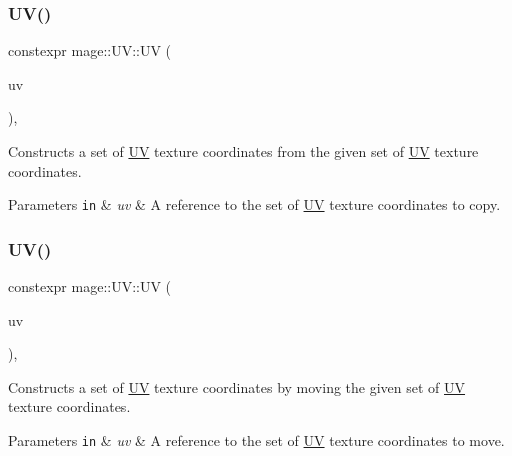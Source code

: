 \subsubsection{\texorpdfstring{U\+V()}{UV()}\hspace{0.1cm}{\footnotesize\ttfamily [3/5]}}
{\footnotesize\ttfamily constexpr mage\+::\+U\+V\+::\+UV (\begin{DoxyParamCaption}\item[{const \hyperlink{structmage_1_1_u_v}{UV} \&}]{uv }\end{DoxyParamCaption})\hspace{0.3cm}{\ttfamily [default]}, {\ttfamily [noexcept]}}

Constructs a set of \hyperlink{structmage_1_1_u_v}{UV} texture coordinates from the given set of \hyperlink{structmage_1_1_u_v}{UV} texture coordinates.


\begin{DoxyParams}[1]{Parameters}
\mbox{\tt in}  & {\em uv} & A reference to the set of \hyperlink{structmage_1_1_u_v}{UV} texture coordinates to copy. \\
\hline
\end{DoxyParams}
\hypertarget{structmage_1_1_u_v_aea441530786bac9c6eb02bff653834bd}{}\label{structmage_1_1_u_v_aea441530786bac9c6eb02bff653834bd} 
\subsubsection{\texorpdfstring{U\+V()}{UV()}\hspace{0.1cm}{\footnotesize\ttfamily [4/5]}}
{\footnotesize\ttfamily constexpr mage\+::\+U\+V\+::\+UV (\begin{DoxyParamCaption}\item[{\hyperlink{structmage_1_1_u_v}{UV} \&\&}]{uv }\end{DoxyParamCaption})\hspace{0.3cm}{\ttfamily [default]}, {\ttfamily [noexcept]}}

Constructs a set of \hyperlink{structmage_1_1_u_v}{UV} texture coordinates by moving the given set of \hyperlink{structmage_1_1_u_v}{UV} texture coordinates.


\begin{DoxyParams}[1]{Parameters}
\mbox{\tt in}  & {\em uv} & A reference to the set of \hyperlink{structmage_1_1_u_v}{UV} texture coordinates to move. \\
\hline
\end{DoxyParams}
\hypertarget{structmage_1_1_u_v_ab5b287a94fef45b70f7c6d50ede33bff}{}\label{structmage_1_1_u_v_ab5b287a94fef45b70f7c6d50ede33bff} 
